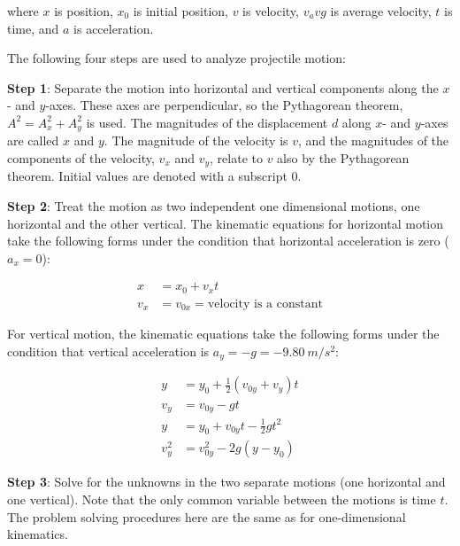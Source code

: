 \documentclass[dvipsnames]{article}
\numberwithin{equation}{section}
\numberwithin{figure}{section}
\begin{document}
where $x$ is position, $x_0$ is initial position, $v$ is velocity, $v_avg$ is average velocity, $t$ is time, and $a$ is acceleration.

\vspace{1em}

The following four steps are used to analyze projectile motion:

\vspace{1em}

\textbf{Step 1}: Separate the motion into horizontal and vertical components along the $x$- and $y$-axes. These axes are perpendicular, so the Pythagorean theorem, $A^2 = A_x^2 + A_y^2$ is used. The magnitudes of the displacement $d$ along $x$- and $y$-axes are called $x$ and  $y$. The magnitude of the velocity is $v$, and the magnitudes of the components of the velocity, $v_x$ and $v_y$, relate to $v$ also by the Pythagorean theorem. Initial values are denoted with a subscript 0.

\vspace{1em}

\textbf{Step 2}: Treat the motion as two independent one dimensional motions, one horizontal and the other vertical. The kinematic equations for horizontal motion take the following forms under the condition that horizontal acceleration is zero ($a_x = 0$):

\begin{align}
    x &= x_0 + v_x t \label{7fMAPG}\\[0.5ex]
    v_x &= v_{0x} = \text{velocity is a constant} \label{dCvDf4}
\end{align}

For vertical motion, the kinematic equations take the following forms under the condition that vertical acceleration is $a_y = -g = \SI{-9.80}{m/s^2}$:

\begin{align}
    y &= y_0 + \frac{1}{2}\left(v_{0y} + v_y\right)t\\[0.5ex]
    v_y &= v_{0y} - gt \label{SjYaoE} \\[0.5ex]
    y &= y_0 + v_{0y}t - \frac{1}{2}  g t^2  \label{36YuvF} \\[0.5ex]
    v_y^2 &= v_{0y}^2 - 2 g (y - y_0) \label{wROSXN}
\end{align}

\vspace{1em}

\textbf{Step 3}: Solve for the unknowns in the two separate motions (one horizontal and one vertical). Note that the only common variable between the motions is time $t$. The problem solving procedures here are the same as for one-dimensional kinematics.
\end{document}
